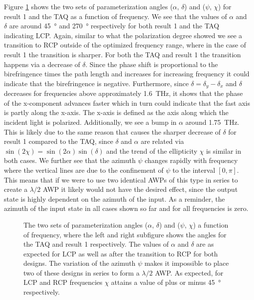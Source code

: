 Figure \ref{fig:cl4_params} shows the two sets of parameterization angles ($\alpha$, $\delta$) and ($\psi$, $\chi$) for result 1 and the TAQ as a function of frequency. We see that the values of $\alpha$ and $\delta$ are around \SI{45}{\degree} and \SI{270}{\degree} respectively for both result 1 and the TAQ indicating LCP. Again, similar to what the polarization degree showed we see a transition to RCP outside of the optimized frequency range, where in the case of result 1 the transition is sharper. For both the TAQ and result 1 the transition happens via a decrease of $\delta$. Since the phase shift is proportional to the birefringence times the path length and increases for increasing frequency it could indicate that the birefringence is negative. Furthermore, since $\delta = \delta_y - \delta_x$ and $\delta$ decreases for frequencies above approximately \SI{1.6}{\tera \hertz}, it shows that the phase of the x-component advances faster which in turn could indicate that the fast axis is partly along the x-axis. The x-axis is defined as the axis along which the incident light is polarized. Additionally, we see a bump in $\alpha$ around \SI{1.75}{\tera \hertz}. This is likely due to the same reason that causes the sharper decrease of $\delta$ for result 1 compared to the TAQ, since $\delta$ and $\alpha$ are related via $\sin(2\chi)=\sin(2\alpha)\sin(\delta)$ and the trend of the ellipticity $\chi$ is similar in both cases. We further see that the azimuth $\psi$ changes rapidly with frequency where the vertical lines are due to the confinement of $\psi$ to the interval $\left[0, \pi\right]$. This means that if we were to use two identical AWPs of this type in series to create a $\lambda/2$ AWP it likely would not have the desired effect, since the output state is highly dependent on the azimuth of the input. As a reminder, the azimuth of the input state in all cases shown so far and for all frequencies is zero.

\begin{figure}[ht]
    \centering
    
    \caption{The two sets of parameterization angles ($\alpha$, $\delta$) and ($\psi$, $\chi$) a function of frequency, where the left and right subfigure shows the angles for the TAQ and result 1 respectively. The values of $\alpha$ and $\delta$ are as expected for LCP as well as after the transition to RCP for both designs. The variation of the azimuth $\psi$ makes it impossible to place two of these designs in series to form a $\lambda/2$ AWP. As expected, for LCP and RCP frequencies $\chi$ attains a value of plus or minus \SI{45}{\degree} respectively.}
    \label{fig:cl4_params}
\end{figure}

